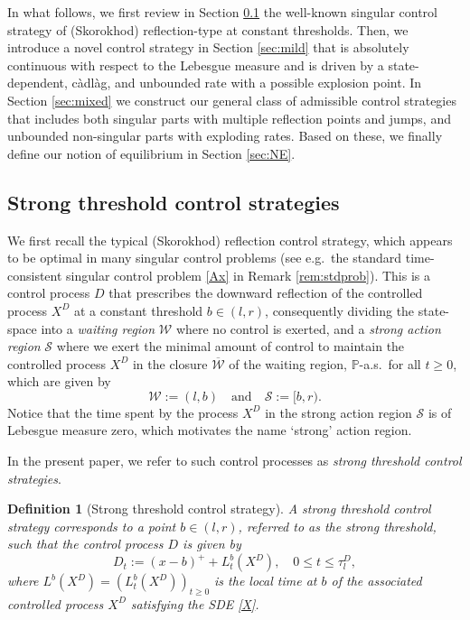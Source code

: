 \documentclass[11pt]{article} %
\newtheorem{definition}[theorem]{Definition}
\numberwithin{komcounter}{section}
\begin{document}
In what follows, we first review in Section \ref{sec:strong} the well-known singular control strategy of (Skorokhod) reflection-type at constant thresholds. 
Then, we introduce a novel control strategy in Section \ref{sec:mild} that is absolutely continuous with respect to the Lebesgue measure and is driven by a state-dependent, c\`adl\`ag, and unbounded rate with a possible explosion point. 
In Section \ref{sec:mixed} we construct our general class of admissible control strategies that includes both singular parts with multiple reflection points and jumps, and unbounded non-singular parts with exploding rates. 
Based on these, we finally define our notion of equilibrium in Section \ref{sec:NE}.



\subsection{Strong threshold control strategies}
\label{sec:strong}

We first recall the typical (Skorokhod) reflection control strategy, which appears to be optimal in many singular control problems (see e.g.~the standard time-consistent singular control problem \eqref{Ax} in Remark \ref{rem:stdprob}). 
This is a control process $D$ that prescribes the downward reflection of the controlled process $X^D$ at a constant threshold $b \in (l,r)$, consequently dividing the state-space into a 
 \textit{waiting region} $\mathcal{W}$ where no control is exerted, and a \textit{strong action region} $\mathcal{S}$ where we exert the minimal amount of control to maintain the controlled process $X^D$ in the closure $\overline{\mathcal{W}}$ of the waiting region, $\mathbb{P}$-a.s.~for all $t \geq 0$, which are given by 
$$
\mathcal{W}:= (l,b)
\quad \text{and} \quad 
\mathcal{S}:= [b,r).
$$
Notice that the time spent by the process $X^D$ in the strong action region $\mathcal{S}$ is of Lebesgue measure zero, which motivates the name `strong' action region. 

In the present paper, we refer to such control processes as {\it strong threshold control strategies}. 

\begin{definition} [Strong threshold control strategy] \label{def:strong}
A strong threshold control strategy corresponds to a point $b\in (l,r)$, referred to as the strong threshold, such that the control process $D$ is given by 
$$
D_t := (x-b)^+ + L^{b}_t(X^{D}) , 
\quad 0 \leq t \leq \tau^D_l,
$$
where $L^b(X^D)=(L^b_t(X^D))_{t\geq0}$ is the local time at $b$ of the associated controlled process $X^D$ satisfying the SDE \eqref{X}. 
\end{definition}
\end{document}
